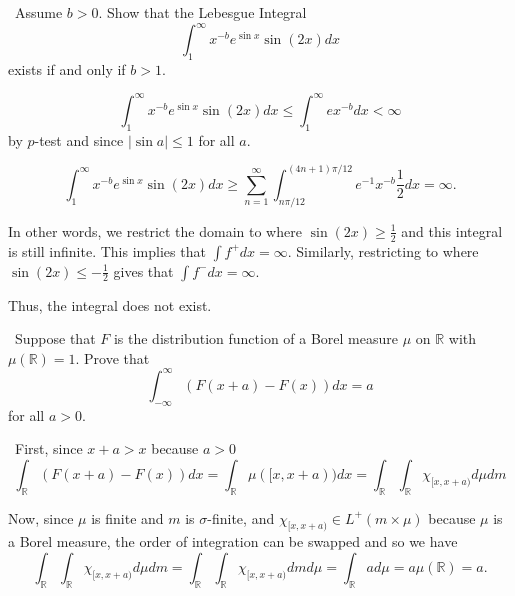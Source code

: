 \documentclass[12pt]{Qual}
\begin{document}
\begin{problem} $\,$
Assume $b>0$. Show that the Lebesgue Integral $$\int_1^\infty x^{-b}e^{\sin x}\sin(2x)dx$$ exists if and only if $b>1$.
\end{problem}


\begin{solution}$\,$
 $$\int_1^\infty x^{-b}e^{\sin x}\sin(2x)dx\le\int_1^\infty ex^{-b}dx<\infty$$ by $p$-test and since $|\sin a|\le1$ for all $a$.

 $$\int_1^\infty x^{-b}e^{\sin x}\sin(2x)dx\ge\sum_{n=1}^\infty\int_{n\pi/12}^{(4n+1)\pi/12} e^{-1}x^{-b}\frac{1}{2}dx=\infty.$$

In other words, we restrict the domain to where $\sin(2x)\ge\frac{1}{2}$ and this integral is still infinite. This implies that $\int f^+dx=\infty$. Similarly, restricting to where $\sin(2x)\le-\frac{1}{2}$ gives that $\int f^-dx=\infty$.

Thus, the integral does not exist.
\end{solution}
\newpage

\begin{problem} $\,$
Suppose that $F$ is the distribution function of a Borel measure $\mu$ on $\mathbb{R}$ with $\mu(\mathbb{R})=1$. Prove that $$\int_{-\infty}^\infty(F(x+a)-F(x))dx=a$$ for all $a>0$.
\end{problem}


\begin{solution}$\,$
First, since $x+a>x$ because $a>0$
$$\int_\mathbb{R}(F(x+a)-F(x))dx=\int_\mathbb{R}\mu([x,x+a))dx=\int_\mathbb{R}\int_\mathbb{R}\chi_{[x,x+a)}d\mu dm$$

Now, since $\mu$ is finite and $m$ is $\sigma$-finite, and $\chi_{[x,x+a)}\in L^+(m\times\mu)$ because $\mu$ is a Borel measure, the order of integration can be swapped and so we have $$\int_\mathbb{R}\int_\mathbb{R}\chi_{[x,x+a)}d\mu dm=\int_\mathbb{R}\int_\mathbb{R}\chi_{[x,x+a)}dmd\mu=\int_\mathbb{R} ad\mu=a\mu(\mathbb{R})=a.$$
\end{solution}
\vspace{0.5cm}
\end{document}
